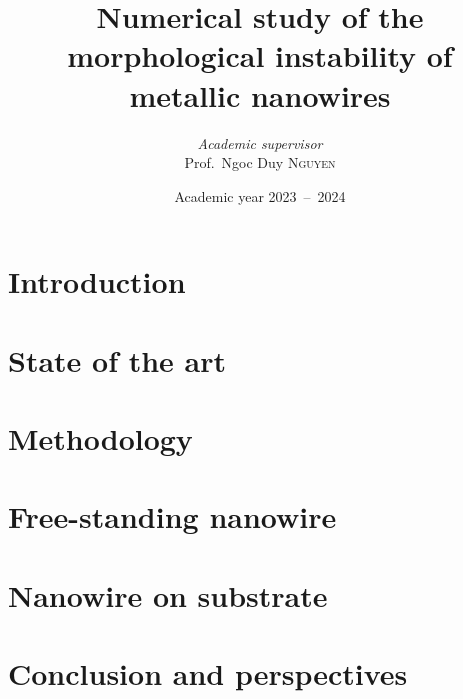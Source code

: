 \documentclass[twoside, 12pt]{extreport}
\institute{University of Liège}
\title{Numerical study of the morphological instability of metallic nanowires}
\author{\textit{Academic supervisor}\\Prof.\ Ngoc Duy \textsc{Nguyen}}
\date{Academic year 2023\ --\ 2024}
\begin{document}
    \maketitle
    \chapter*{Introduction}\label{chap:intro}
    
    \chapter{State of the art}\label{chap:1-sota}
    
    \chapter{Methodology}\label{chap:2-methodology}
    
    \chapter{Free-standing nanowire}\label{chap:3-results}

    
    \chapter{Nanowire on substrate}\label{chap:4-substrate}
    
    \chapter*{Conclusion and perspectives}\label{chap:concl}
    

    
    \newpage
    \appendix
    
    
    \newpage
    \nocite{*}
    \printbibliography
\end{document}
